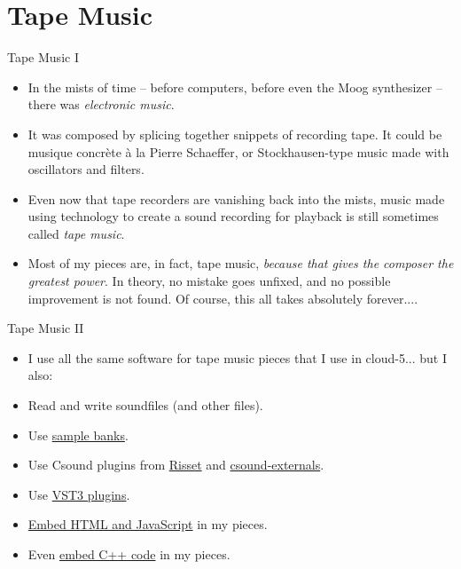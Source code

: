 \documentclass{beamer}
\begin{document}
\section{Tape Music}
\begin{frame}{Tape Music I}

\begin{itemize}
\item In the mists of time -- before computers, before even the Moog synthesizer -- there was \emph{electronic music}.
\item It was composed by splicing together snippets of recording tape. It could be musique concrète à la Pierre Schaeffer, or Stockhausen-type music made with oscillators and filters.
\item Even now that tape recorders are vanishing back into the mists, music made using technology to create a sound recording for playback is still sometimes called \emph{tape music}.
\item Most of my pieces are, in fact, tape music, \emph{because that gives the composer the greatest power}. In theory, no mistake goes unfixed, and no possible improvement is not found. Of course, this all takes absolutely forever....
\end{itemize}
\end{frame}

\begin{frame}{Tape Music II}

\begin{itemize}
\item I use all the same software for tape music pieces that I use in cloud-5... but I also:
\item Read and write soundfiles (and other files).
\item Use \href{https://www.zanderjaz.com/downloads/soundfonts}{sample banks}.
\item Use Csound plugins from \href{https://github.com/csound-plugins/risset-data/tree/master}{Risset} and \href{https://github.com/csound-plugins/csound-externals}{csound-externals}.
\item Use \href{https://github.com/gogins/csound-vst3-opcodes}{VST3 plugins}.
\item \href{https://github.com/gogins/csound-webserver-opcodes}{Embed HTML and JavaScript} in my pieces.
\item Even \href{https://github.com/gogins/csound-cxx-opcodes}{embed C++ code} in my pieces.
\end{itemize}
\end{frame}
\end{document}

